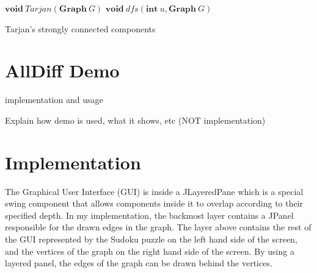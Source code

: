 \documentclass{l4proj}
\begin{document}
\begin{algorithm}
\DontPrintSemicolon
\nl $\textbf{void} ~Tarjan(\textbf{Graph}~G)$ \;
\nl {}
\;
\nl $\textbf{void} ~dfs(\textbf{int}~u, \textbf{Graph}~G)$ \;
\nl {}
\caption{Tarjan's strongly connected components}
\label{TarjanPC}
\end{algorithm}

\chapter{AllDiff Demo}
implementation and usage

Explain how demo is used, what it shows, etc (NOT implementation)

 
\chapter{Implementation}
\noindent The Graphical User Interface (GUI) is inside a JLayeredPane which is a special swing component that allows components inside it to overlap according to their specified depth. In my implementation, the backmost layer contains a JPanel responsible for the drawn edges in the graph. The layer above contains the rest of the GUI represented by the Sudoku puzzle on the left hand side of the screen, and the vertices of the graph on the right hand side of the screen. By using a layered panel, the edges of the graph can be drawn behind the vertices.
\end{document}
